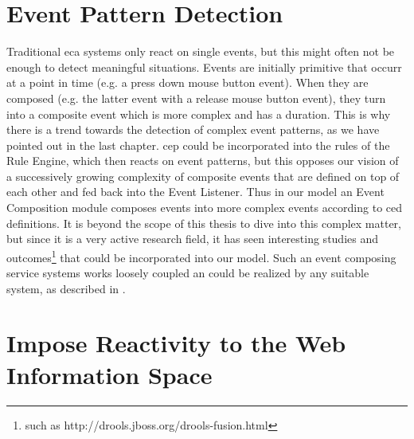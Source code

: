 \section{Event Pattern Detection}
Traditional \textrm{\acrshort{eca}} systems only react on single events, but this might often not be enough to detect meaningful situations.
Events are initially primitive that occurr at a point in time (e.g. a press down mouse button event).
When they are composed (e.g. the latter event with a release mouse button event), they turn into a composite event which is more complex and has a duration.
This is why there is a trend towards the detection of complex event patterns, as we have pointed out in the last chapter.
\textrm{\acrshort{cep}} could be incorporated into the rules of the \textrm{Rule Engine}, which then reacts on event patterns, but this opposes our vision of a successively growing complexity of composite events that are defined on top of each other and fed back into the \textrm{Event Listener}.
Thus in our model an \textrm{Event Composition} module composes events into more complex events according to \textrm{\acrshort{ced}} definitions.
It is beyond the scope of this thesis to dive into this complex matter, but since it is a very active research field, it has seen interesting studies\cite{akdere2008plan}\cite{2004_1265833} and outcomes\footnote{such as http://drools.jboss.org/drools-fusion.html} that could be incorporated into our model.
Such an event composing service systems works loosely coupled an could be realized by any suitable system, as described in \cite{robins2010complex}.



\section{Impose Reactivity to the Web Information Space}




